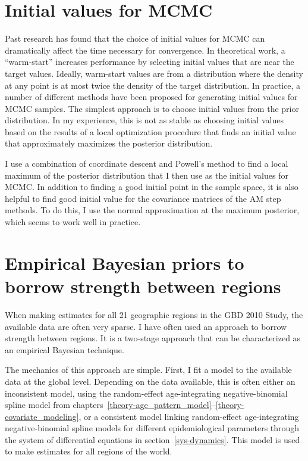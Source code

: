 \section{Initial values for MCMC}
Past research has found that the choice of initial values for MCMC can
dramatically affect the time necessary for convergence.  In
theoretical work, a ``warm-start'' increases performance by selecting
initial values that are near the target values.  Ideally, warm-start
values are from a distribution where the density at any point is at most
twice the density of the target distribution. \cite{lovasz_hit-and-run_1999,
  kannan_random_1997} In practice, a number of different methods have
been proposed for generating initial values for MCMC
samples.\cite{gelman_inference_1992,
  frieze_sampling_1994,jennison_discussion_1993,
  brooks_general_1998,brooks_convergence_1998} The simplest approach
is to choose initial values from the prior distribution.  In my
experience, this is not as stable as choosing initial values based on
the results of a local optimization procedure that finds an initial
value that approximately maximizes the posterior distribution.

I use a combination of coordinate descent and Powell's method to
find a local maximum of the posterior distribution that I then use
as the initial values for
MCMC.\cite{tseng_convergence_2001,powell_efficient_1964} In addition to
finding a good initial point in the sample space, it is also helpful
to find good initial value for the covariance matrices of the AM step
methods.  To do this, I use the normal approximation at the maximum
posterior, which seems to work well in practice.


\section{Empirical Bayesian priors to borrow strength between regions}
\label{empirical-priors}

When making estimates for all 21 geographic regions in the
GBD 2010 Study, the available data are often very
sparse.  I have often used an approach to borrow strength between
regions.  It is a two-stage approach
that can be characterized as an empirical Bayesian technique.

The mechanics of this approach are simple.  First, I fit a model to
the available data at the global level.  Depending on the data
available, this is often either an inconsistent model, using the
random-effect age-integrating negative-binomial spline model from
chapters~\ref{theory-age_pattern_model}--\ref{theory-covariate_modeling},
or a consistent model linking random-effect
age-integrating negative-binomial spline models for different
epidemiological parameters through the system of differential
equations in section~\ref{sys-dynamics}.  This model is used to make
estimates for all regions of the world.

